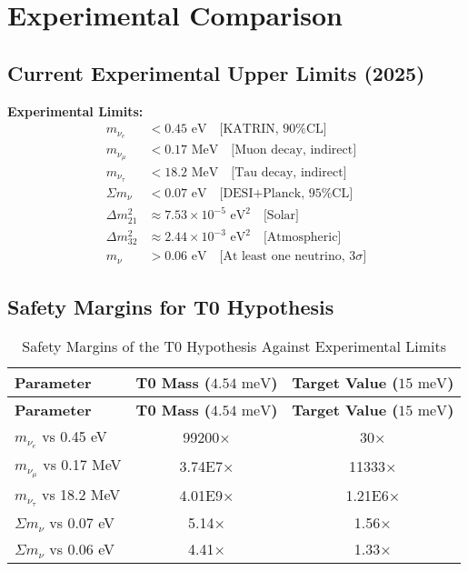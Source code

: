 \documentclass[12pt,a4paper]{article}
\begin{document}
	\section{Experimental Comparison}
	
	\subsection{Current Experimental Upper Limits (2025)}
	
	\begin{experimental}
		\textbf{Experimental Limits:}
		\begin{align}
			m_{\nu_e} &< 0.45 \text{ eV} \quad \text{[KATRIN, 90\% CL]} \\
			m_{\nu_\mu} &< 0.17 \text{ MeV} \quad \text{[Muon decay, indirect]} \\
			m_{\nu_\tau} &< 18.2 \text{ MeV} \quad \text{[Tau decay, indirect]} \\
			\Sigma m_\nu &< 0.07 \text{ eV} \quad \text{[DESI+Planck, 95\% CL]} \\
			\Delta m^2_{21} &\approx 7.53 \times 10^{-5} \text{ eV}^2 \quad \text{[Solar]} \\
			\Delta m^2_{32} &\approx 2.44 \times 10^{-3} \text{ eV}^2 \quad \text{[Atmospheric]} \\
			m_\nu &> 0.06 \text{ eV} \quad \text{[At least one neutrino, 3}\sigma\text{]}
		\end{align}
	\end{experimental}
	
	\subsection{Safety Margins for T0 Hypothesis}
	
	\begin{longtable}[c]{@{}lcc@{}}
		\caption{Safety Margins of the T0 Hypothesis Against Experimental Limits} \\
		\toprule
		\textbf{Parameter} & \textbf{T0 Mass (\(4.54 \text{ meV}\))} & \textbf{Target Value (\(15 \text{ meV}\))} \\
		\midrule
		\endfirsthead
		\toprule
		\textbf{Parameter} & \textbf{T0 Mass (\(4.54 \text{ meV}\))} & \textbf{Target Value (\(15 \text{ meV}\))} \\
		\midrule
		\endhead
		$m_{\nu_e}$ vs 0.45 eV & 99200× & 30× \\
		$m_{\nu_\mu}$ vs 0.17 MeV & 3.74E7× & 11333× \\
		$m_{\nu_\tau}$ vs 18.2 MeV & 4.01E9× & 1.21E6× \\
		\midrule
		$\Sigma m_\nu$ vs 0.07 eV & 5.14× & 1.56× \\
		$\Sigma m_\nu$ vs 0.06 eV & 4.41× & 1.33× \\
		\bottomrule
	\end{longtable}
	
\end{document}
